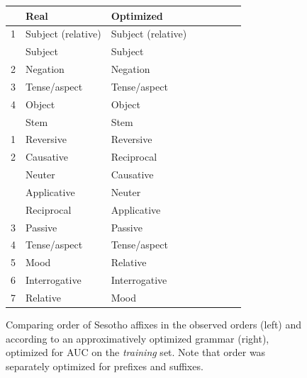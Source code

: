 \documentclass[11pt,letterpaper]{article}
\begin{document}
\begin{figure}
    \centering
    \begin{tabular}{llllllll}
            &       Real & Optimized \\ \hline\hline
	    1&Subject (relative) & Subject (relative) \\
	    &Subject & Subject \\
	    2&Negation & Negation \\
	    3&Tense/aspect & Tense/aspect \\
	    4&Object & Object \\ \hline
	    &Stem & Stem \\ \hline
	    1&	    Reversive & Reversive \\
	    2&Causative & Reciprocal \\
	    &Neuter & Causative \\
	    &Applicative & Neuter \\
	    &Reciprocal & Applicative \\
	    3&Passive & Passive \\
	    4&Tense/aspect & Tense/aspect \\
	    5&Mood & Relative \\
	    6&Interrogative & Interrogative \\
	    7&Relative & Mood \\ \hline
    \end{tabular}
	\caption{Comparing order of Sesotho affixes in the observed orders (left) and according to an approximatively optimized grammar (right), optimized for AUC on the \emph{training} set. Note that order was separately optimized for prefixes and suffixes.}
    \label{fig:grammar-table-sesotho}
\end{figure}







\end{document}
